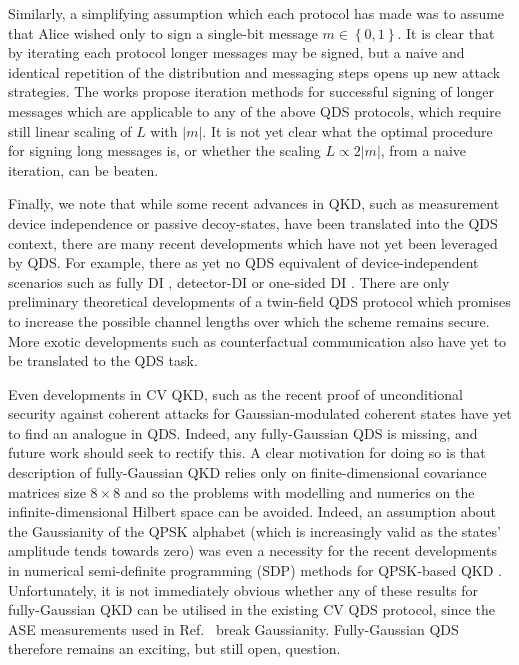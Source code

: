 Similarly, a simplifying assumption which each protocol has made was to assume that Alice wished only to sign a single-bit message $m \in \left\{0, 1\right\}$. It is clear that by iterating each protocol longer messages may be signed, but a naive and identical repetition of the distribution and messaging steps opens up new attack strategies. The works \cite{Wang2015, Wang2017} propose iteration methods for successful signing of longer messages which are applicable to any of the above QDS protocols, which require still linear scaling of $L$ with $\left|m\right|$. It is not yet clear what the optimal procedure for signing long messages is, or whether the scaling $L \propto 2 \left|m\right|$, from a naive iteration, can be beaten. 

Finally, we note that while some recent advances in QKD, such as measurement device independence or passive decoy-states, have been translated into the QDS context, there are many recent developments which have not yet been leveraged by QDS. For example, there as yet no QDS equivalent of device-independent scenarios such as fully DI \cite{Vazirani2014}, detector-DI \cite{Lim2014a} or one-sided DI \cite{Walk2016a}. There are only preliminary theoretical developments of a twin-field \cite{Curty2018, Lucamarini2018} QDS protocol \cite{Zhang2020} which promises to increase the possible channel lengths over which the scheme remains secure. More exotic developments such as counterfactual communication \cite{Noh2009, Salih2013a, Hance2019, Vaidman2019} also have yet to be translated to the QDS task. 

Even developments in CV QKD, such as the recent proof of unconditional security against coherent attacks for Gaussian-modulated coherent states \cite{Leverrier2017} have yet to find an analogue in QDS. Indeed, any fully-Gaussian QDS is missing, and future work should seek to rectify this. A clear motivation for doing so is that description of fully-Gaussian QKD relies only on finite-dimensional covariance matrices size $8 \times 8$ \cite{Laudenbach2017} and so the problems with modelling and numerics on the infinite-dimensional Hilbert space can be avoided. Indeed, an assumption about the Gaussianity of the QPSK alphabet (which is increasingly valid as the states' amplitude tends towards zero) was even a necessity for the recent developments in numerical semi-definite programming (SDP) methods for QPSK-based QKD \cite{Lin2019, Ghorai2019}. Unfortunately, it is not immediately obvious whether any of these results for fully-Gaussian QKD can be utilised in the existing CV QDS protocol, since the ASE measurements used in Ref.~\cite{Croal2016} break Gaussianity. Fully-Gaussian QDS therefore remains an exciting, but still open, question.


